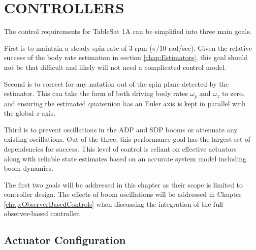 
\chapter{CONTROLLERS}
\label{chap:Controllers}

The control requirements for TableSat 1A can be simplified into three main goals.

First is to maintain a steady spin rate of 3 rpm ($\pi/10$ rad/sec).  Given the relative success of the body rate estimation in section \ref{chap:Estimators}, this goal should not be that difficult and likely will not need a complicated control model.

Second is to correct for any nutation out of the spin plane detected by the estimator.  This can take the form of both driving body rates $\omega_y$ and $\omega_z$ to zero, and ensuring the estimated quaternion has an Euler axis is kept in parallel with the global $z$-axis.

Third is to prevent oscillations in the ADP and SDP booms or attenuate any existing oscillations.  Out of the three, this performance goal has the largest set of dependencies for success.  This level of control is reliant on effective actuators along with reliable state estimates based on an accurate system model including boom dynamics.

The first two goals will be addressed in this chapter as their scope is limited to controller design.  The effects of boom oscillations will be addressed in Chapter \ref{chap:ObserverBasedControls} when discussing the integration of the full observer-based controller.

\section{Actuator Configuration}
\label{sec:ActuatorConfiguration}

